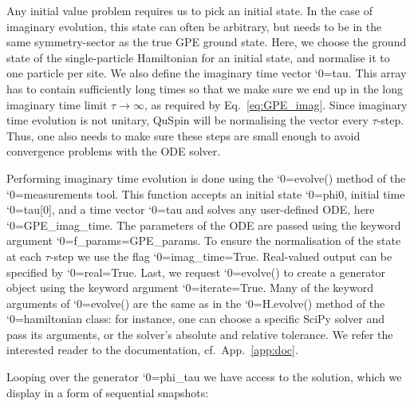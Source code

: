 \documentclass{SciPost}
\newcommand\0{\scalebox{-1}[1]{0}}
\let\svttfamily\ttfamily
\renewcommand\ttfamily{\svttfamily\catcode`0=\active }
\renewcommand\texttt{\bgroup\ttfamily\texttthelp}
\def\texttthelp#1{#1\egroup}
\newcommand{\GPcode}{example8.py}
\begin{document}

Any initial value problem requires us to pick an initial state. In the case of imaginary evolution, this state can often be arbitrary, but needs to be in the same symmetry-sector as the true GPE ground state. Here, we choose the ground state of the single-particle Hamiltonian for an initial state, and normalise it to one particle per site. We also define the imaginary time vector \texttt{tau}. This array has to contain sufficiently long times so that we make sure we end up in the long imaginary time limit $\tau\to\infty$, as required by Eq.~\eqref{eq:GPE_imag}. Since imaginary time evolution is not unitary, QuSpin will be normalising the vector every $\tau$-step. Thus, one also needs to make sure these steps are small enough to avoid convergence problems with the ODE solver.

Performing imaginary time evolution is done using the \texttt{evolve()} method of the \texttt{measurements} tool. This function accepts an initial state \texttt{phi0}, initial time \texttt{tau[0]}, and a time vector \texttt{tau} and solves any user-defined ODE, here \texttt{GPE\_imag\_time}. The parameters of the ODE are passed using the keyword argument \texttt{f\_params=GPE\_params}. To ensure the normalisation of the state at each $\tau$-step we use the flag \texttt{imag\_time=True}. Real-valued output can be specified by \texttt{real=True}. Last, we request \texttt{evolve()} to create a generator object using the keyword argument \texttt{iterate=True}. Many of the keyword arguments of \texttt{evolve()} are the same as in the \texttt{H.evolve()} method of the \texttt{hamiltonian} class: for instance, one can choose a specific SciPy solver and pass its arguments, or the solver's absolute and relative tolerance. We refer the interested reader to the documentation, cf.~App.~\ref{app:doc}.

Looping over the generator \texttt{phi\_tau} we have access to the solution, which we display in a form of sequential snapshots:

\end{document}
